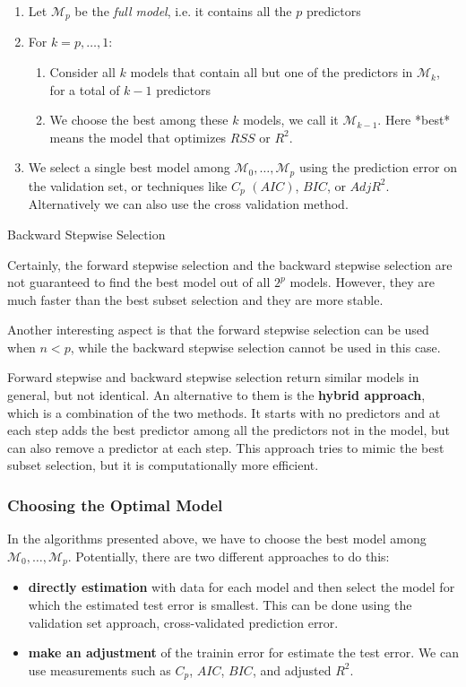 \begin{algorithm}
    \begin{enumerate}
        \item Let $\mathcal M_p$ be the \textit{full model}, i.e. it contains all the $p$ predictors
        \item For $k=p,\dots,1$:
        \begin{enumerate}
            \item Consider all $k$ models that contain all but one of the predictors in $\mathcal M_k$, for a total of $k-1$ predictors
            \item We choose the best among these $k$ models, we call it $\mathcal M_{k-1}$. Here *best* means the model that optimizes $RSS$ or $R^2$.
        \end{enumerate}
        \item We select a single best model among $\mathcal M_0,\dots,\mathcal M_p$ using the prediction error on the validation set, or techniques like $C_p$ $(AIC)$, $BIC$, or $ AdjR^2$. Alternatively we can also use the cross validation method.
    \end{enumerate}
    \caption{Backward Stepwise Selection}
    \label{alg:backward_stepwise_selection}
\end{algorithm}

Certainly, the forward stepwise selection and the backward stepwise selection are not guaranteed to find the best model out of all $2^p$ models. However, they are much faster than the best subset selection and they are more stable.

Another interesting aspect is that the forward stepwise selection can be used when $n < p$, while the backward stepwise selection cannot be used in this case.

Forward stepwise and backward stepwise selection return similar models in general, but not identical. An alternative to them is the \textbf{hybrid approach}, which is a combination of the two methods. It starts with no predictors and at each step adds the best predictor among all the predictors not in the model, but can also remove a predictor at each step. This approach tries to mimic the best subset selection, but it is computationally more efficient.
\subsubsection*{Choosing the Optimal Model}
In the algorithms presented above, we have to choose the best model among $\mathcal M_0, \dots, \mathcal M_p$. Potentially, there are two different approaches to do this:
\begin{itemize}
    \item \textbf{directly estimation} with data for each model and then select the model for which the estimated test error is smallest. This can be done using the validation set approach, cross-validated prediction error.
    \item \textbf{make an adjustment} of the trainin error for estimate the test error. We can use measurements such as $C_p$, $AIC$, $BIC$, and adjusted $R^2$.
\end{itemize}

